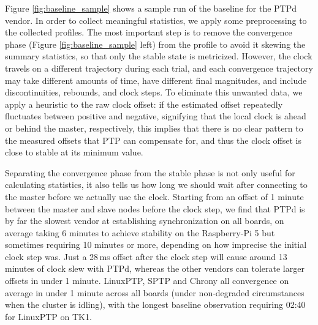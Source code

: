 Figure \ref{fig:baseline_sample} shows a sample run of the baseline for the PTPd vendor. In order to collect meaningful statistics, we apply some preprocessing to the collected profiles. The most important step is to remove the convergence phase (Figure \ref{fig:baseline_sample} left) from the profile to avoid it skewing the summary statistics, so that only the stable state is metricized. However, the clock travels on a different trajectory during each trial, and each convergence trajectory may take different amounts of time, have different final magnitudes, and include discontinuities, rebounds, and clock steps. To eliminate this unwanted data, we apply a heuristic to the raw clock offset: if the estimated offset repeatedly fluctuates between positive and negative, signifying that the local clock is ahead or behind the master, respectively, this implies that there is no clear pattern to the measured offsets that PTP can compensate for, and thus the clock offset is close to stable at its minimum value.

Separating the convergence phase from the stable phase is not only useful for calculating statistics, it also tells us how long we should wait after connecting to the master before we actually use the clock. Starting from an offset of 1 minute between the master and slave nodes before the clock step, we find that PTPd is by far the slowest vendor at establishing synchronization on all boards, on average taking 6 minutes to achieve stability on the Raspberry-Pi 5 but sometimes requiring 10 minutes or more, depending on how imprecise the initial clock step was. Just a 28\,ms offset after the clock step will cause around 13 minutes of clock slew with PTPd, whereas the other vendors can tolerate larger offsets in under 1 minute. LinuxPTP, SPTP and Chrony all convergence on average in under 1 minute across all boards (under non-degraded circumstances when the cluster is idling), with the longest baseline observation requiring 02:40 for LinuxPTP on TK1.

